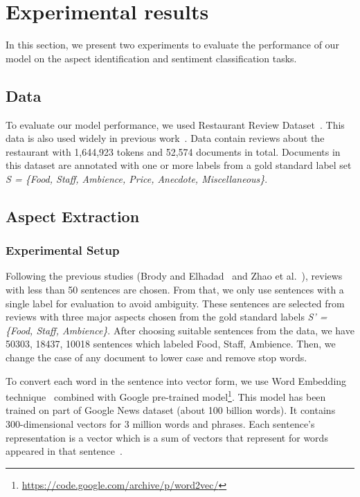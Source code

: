 \section{Experimental results} \label{experiments}

In this section, we present two experiments to evaluate the performance of our model on the aspect identification and sentiment classification tasks.

\subsection{Data}

To evaluate our model performance, we used Restaurant Review Dataset~\cite{data_ganu}.
This data is also used widely in previous work~\cite{data_ganu,Brody_Elhadad,Zhao}.
Data contain reviews about the restaurant with 1,644,923 tokens and 52,574 documents in total.
Documents in this dataset are annotated with one or more labels from a gold standard label set \textit{S = \{Food, Staff, Ambience, Price, Anecdote, Miscellaneous\}}.

\subsection{Aspect Extraction}
\subsubsection{Experimental Setup}

Following the previous studies (Brody and Elhadad~\cite{Brody_Elhadad} and Zhao et al.~\cite{Zhao}), reviews with less than 50 sentences are chosen.
From that, we only use sentences with a single label for evaluation to avoid ambiguity.
These sentences are selected from reviews with three major aspects chosen from the gold standard labels \textit{S' = \{Food, Staff, Ambience\}}.
After choosing suitable sentences from the data, we have 50303, 18437, 10018 sentences which labeled Food, Staff, Ambience.
Then, we change the case of any document to lower case and remove stop words.

To convert each word in the sentence into vector form, we use Word Embedding technique~\cite{rehurek_lrec_word2vec} combined with Google pre-trained model\footnote{\url{https://code.google.com/archive/p/word2vec/}}.
This model has been trained on part of Google News dataset (about 100 billion words).
It contains 300-dimensional vectors for 3 million words and phrases.
Each sentence's representation is a vector which is a sum of vectors that represent for words appeared in that sentence~\cite{Quoc_Le}.

